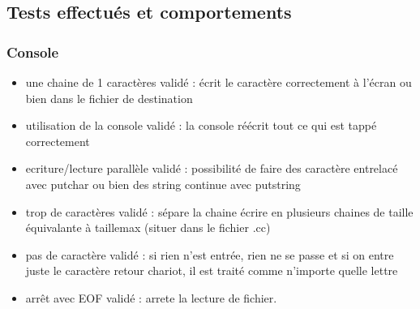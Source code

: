 \documentclass{article}
\begin{document}
	\subsection{Tests effectués et comportements}
		\subsubsection{Console}
			\begin{itemize}
				\item une chaine de 1 caractères 			validé : écrit le caractère	correctement à l'écran ou bien dans le fichier de destination
				\item utilisation de la console				validé : la console réécrit tout ce qui est tappé correctement
				\item ecriture/lecture parallèle			validé : possibilité de faire des caractère entrelacé avec putchar ou bien des string continue avec putstring
				\item trop de caractères					validé : sépare la chaine écrire en plusieurs chaines de taille équivalante à taillemax (situer dans le fichier .cc)
				\item pas de caractère 						validé : si rien n'est entrée, rien ne se passe et si on entre juste le caractère retour chariot, il est traité comme n'importe quelle lettre
				\item arrêt avec EOF 						validé : arrete la lecture de fichier.
			\end{itemize}
\end{document}
